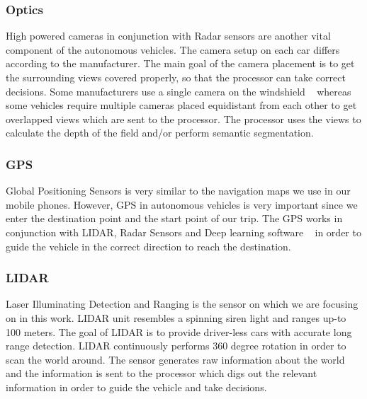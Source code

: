 \smallskip
\subsubsection{Optics}
High powered cameras in conjunction with Radar sensors are another vital component of the autonomous vehicles. The camera setup on each car differs according to the manufacturer. The main goal of the camera placement is to get the surrounding views covered properly, so that the processor can take correct decisions. Some manufacturers use a single camera on the windshield ~\cite{singlecamera} whereas some vehicles require multiple cameras placed equidistant from each other to get overlapped views which are sent to the processor. The processor uses the views to calculate the depth of the field and/or perform semantic segmentation.
\smallskip
\subsubsection{GPS}
Global Positioning Sensors is very similar to the navigation maps we use in our mobile phones. However, GPS in autonomous vehicles is very important since we enter the destination point and the start point of our trip. The GPS works in conjunction with LIDAR, Radar Sensors and Deep learning software ~\cite{GPS} in order to guide the vehicle in the correct direction to reach the destination.
\smallskip
\subsubsection{LIDAR}
Laser Illuminating Detection and Ranging is the sensor on which we are focusing on in this work. LIDAR unit resembles a spinning siren light and ranges up-to 100 meters. The goal of LIDAR is to provide driver-less cars with accurate long range detection. LIDAR continuously performs 360 degree rotation in order to scan the world around. The sensor generates raw information about the world and the information is sent to the processor which digs out the relevant information in order to guide the vehicle and take decisions.

